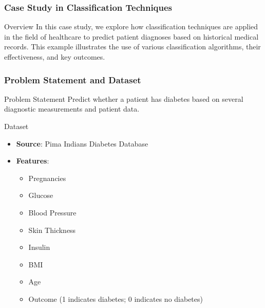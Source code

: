 \documentclass[aspectratio=169]{beamer}
\begin{document}
\begin{frame}[fragile]
    \frametitle{Case Study in Classification Techniques}
    \begin{block}{Overview}
        In this case study, we explore how classification techniques are applied in the field of healthcare to predict patient diagnoses based on historical medical records. This example illustrates the use of various classification algorithms, their effectiveness, and key outcomes.
    \end{block}
\end{frame}

\begin{frame}[fragile]
    \frametitle{Problem Statement and Dataset}
    \begin{block}{Problem Statement}
        Predict whether a patient has diabetes based on several diagnostic measurements and patient data.
    \end{block}
    
    \begin{block}{Dataset}
        \begin{itemize}
            \item \textbf{Source}: Pima Indians Diabetes Database
            \item \textbf{Features}:
            \begin{itemize}
                \item Pregnancies
                \item Glucose
                \item Blood Pressure
                \item Skin Thickness
                \item Insulin
                \item BMI
                \item Age
                \item Outcome (1 indicates diabetes; 0 indicates no diabetes)
            \end{itemize}
        \end{itemize}
    \end{block}
\end{frame}
\end{document}
